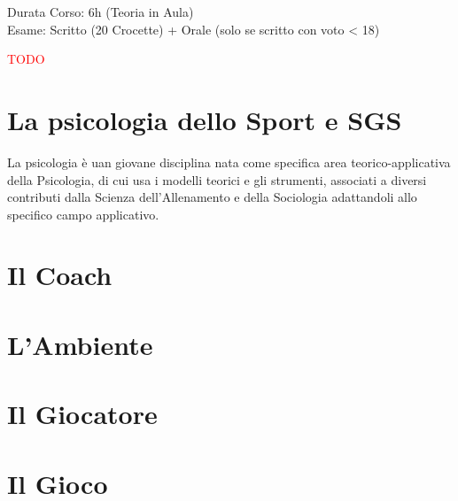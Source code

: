 \documentclass[../uefaC.tex]{subfiles}
\begin{document}

Durata Corso: 6h (Teoria in Aula) \hfill \\
Esame: Scritto (20 Crocette) + Orale (solo se scritto con voto < 18)

\textcolor{red}{TODO}

\section{La psicologia dello Sport e SGS}

La psicologia è uan giovane disciplina nata come specifica area teorico-applicativa della Psicologia, di cui usa i modelli teorici e gli strumenti, associati a diversi contributi dalla Scienza dell'Allenamento e della Sociologia adattandoli allo specifico campo applicativo.

\section{Il Coach}

\section{L'Ambiente}

\section{Il Giocatore}

\section{Il Gioco}
\end{document}
